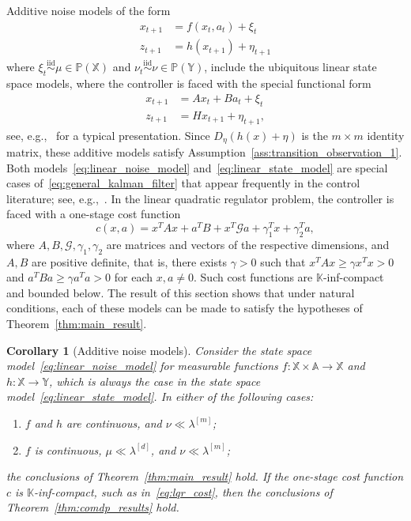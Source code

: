 \documentclass[11pt,onecolumn]{IEEEtran}  %
\newcommand{\Ab}{\mathbb{A}}
\newcommand{\Kb}{\mathbb{K}}
\newcommand{\Pb}{\mathbb{P}}
\newcommand{\Xb}{\mathbb{X}}
\newcommand{\Yb}{\mathbb{Y}}
\newcommand{\iid}{\overset{\mathrm{iid}}{\sim}}
\newtheorem{corollary}{Corollary}
\theoremstyle{definition}
\begin{document}
Additive noise models of the form
\begin{subequations} \label{eq:linear_noise_model}
    \begin{align}
        x_{t+1} &= f(x_t, a_t) + \xi_t \label{eq:linear_noise_state} \\
        z_{t+1} &= h(x_{t+1}) + \eta_{t+1} \label{eq:linear_noise_obs}
    \end{align}
\end{subequations}
where $\xi_t \iid \mu \in \Pb(\Xb)$ and $\nu_t \iid \nu \in \Pb(\Yb)$, include the ubiquitous linear state space models, where the controller is faced with the special functional form
\begin{subequations} \label{eq:linear_state_model}
    \begin{align}
        x_{t+1} &= A x_t + B a_t + \xi_t \label{eq:linear_state} \\
        z_{t+1} &= H x_{t+1} + \eta_{t+1},  \label{eq:linear_obs}
    \end{align}
\end{subequations}
see, e.g.,~\citet[Section 5.1]{simon_optimal_2006} for a typical presentation. Since $D_\eta (h(x) + \eta)$ is the $m\times m$ identity matrix, these additive models satisfy Assumption~\ref{ass:transition_observation_1}. Both models~\eqref{eq:linear_noise_model} and~\eqref{eq:linear_state_model} are special cases of~\eqref{eq:general_kalman_filter} that appear frequently in the control literature; see, e.g.,~\citet{zhou2010solving}. In the linear quadratic regulator problem, the controller is faced with a one-stage cost function
\begin{equation} \label{eq:lqr_cost}
    c(x,a) = x^TA x + a^T B + x^T \mathcal{G} a + \gamma_1^Tx + \gamma_2^Ta,
\end{equation}
where $A,B,\mathcal{G},\gamma_1,\gamma_2$ are matrices and vectors of the respective dimensions, and $A, B$ are positive definite, that is, there exists $\gamma > 0$ such that $x^T A x \ge \gamma x^Tx > 0$ and $a^TB a \ge \gamma a^Ta > 0$ for each $x,a \ne 0$. Such cost functions are $\Kb$-inf-compact and bounded below. The result of this section shows that under natural conditions, each of these models can be made to satisfy the hypotheses of Theorem~\ref{thm:main_result}.

\begin{corollary}[Additive noise models] \label{cor:additive_noise}
    Consider the state space model~\eqref{eq:linear_noise_model} for measurable functions $f : \Xb \times \Ab \to \Xb$ and $h : \Xb \to \Yb$, which is always the case in the state space model~\eqref{eq:linear_state_model}. In either of the following cases:
    \begin{enumerate}
        \item $f$ and $h$ are continuous, and $\nu \ll \lambda^{[m]}$;
        \item $f$ is continuous, $\mu \ll \lambda^{[d]}$, and $\nu \ll \lambda^{[m]}$;
    \end{enumerate}
    the conclusions of Theorem~\ref{thm:main_result} hold. If the one-stage cost function $c$ is $\Kb$-inf-compact, such as in~\eqref{eq:lqr_cost}, then the conclusions of Theorem~\ref{thm:comdp_results} hold.
\end{corollary}
\end{document}
